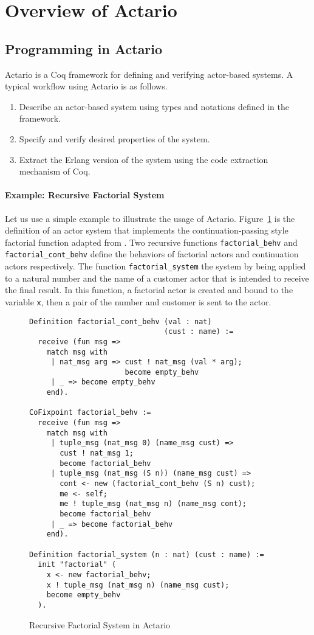 \section{Overview of Actario}
\label{sec:overview}

\subsection{Programming in Actario}

Actario is a Coq framework for defining and verifying actor-based
systems. A typical workflow using Actario is as follows.
\begin{enumerate}
\item Describe an actor-based system using types and notations defined in the framework.
\item Specify and verify desired properties of the system.
\item Extract the Erlang version of the system using the code extraction mechanism of Coq.
\end{enumerate}

\paragraph{Example: Recursive Factorial System}
Let us use a simple example to illustrate the usage of Actario.
Figure~\ref{coq:fact} is the definition of an actor system that implements the
continuation-passing style factorial function adapted from
\cite{Agha:1986aa}.  Two recursive functions \lstinline|factorial_behv| and
\lstinline|factorial_cont_behv| define the behaviors of factorial actors and
continuation actors respectively.  The function \lstinline|factorial_system| the
system by being applied to a natural number and the name of a customer
actor that is intended to receive the final result.  In this function,
a factorial actor is created and bound to the variable \lstinline|x|, then a pair
of the number and customer is sent to the actor.

\begin{figure}[t]
\begin{lstlisting}[style=small]
Definition factorial_cont_behv (val : nat)
                               (cust : name) :=
  receive (fun msg =>
    match msg with
     | nat_msg arg => cust ! nat_msg (val * arg);
                      become empty_behv
     | _ => become empty_behv
    end).

CoFixpoint factorial_behv :=
  receive (fun msg =>
    match msg with
     | tuple_msg (nat_msg 0) (name_msg cust) =>
       cust ! nat_msg 1;
       become factorial_behv
     | tuple_msg (nat_msg (S n)) (name_msg cust) =>
       cont <- new (factorial_cont_behv (S n) cust);
       me <- self;
       me ! tuple_msg (nat_msg n) (name_msg cont);
       become factorial_behv
     | _ => become factorial_behv
    end).

Definition factorial_system (n : nat) (cust : name) :=
  init "factorial" (
    x <- new factorial_behv;
    x ! tuple_msg (nat_msg n) (name_msg cust);
    become empty_behv
  ).
\end{lstlisting}
\caption{Recursive Factorial System in Actario}\label{coq:fact}
\end{figure}

